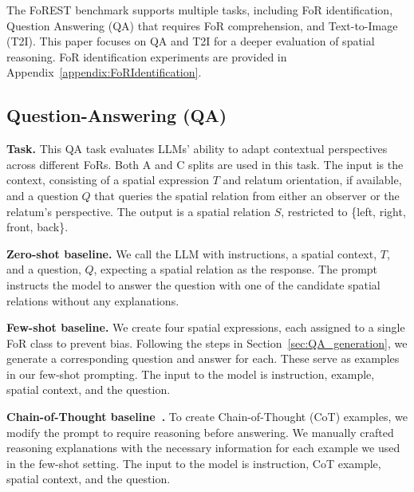 The FoREST benchmark supports multiple tasks, including FoR identification, Question Answering (QA) that requires FoR comprehension, and Text-to-Image (T2I). This paper focuses on QA and T2I for a deeper evaluation of spatial reasoning. 
FoR identification experiments are provided in Appendix~\ref{appendix:FoRIdentification}.

\subsection{Question-Answering (QA)}\label{sec:QA_explanation}

\noindent\textbf{Task.}
This QA task evaluates LLMs’ ability to adapt contextual perspectives across different FoRs.
Both A and C splits are used in this task. 
The input is the context, consisting of a spatial expression $T$ and relatum orientation, if available, and a question $Q$ that queries the spatial relation from either an observer or the relatum’s perspective. 
The output is a spatial relation $S$, restricted to \{left, right, front, back\}.




\noindent\textbf{Zero-shot baseline.} 
We call the LLM with instructions, a spatial context, $T$, and a question, $Q$, expecting a spatial relation as the response. 
The prompt instructs the model to answer the question with one of the candidate spatial relations without any explanations.


\noindent\textbf{Few-shot baseline.} 
We create four spatial expressions, each assigned to a single FoR class to prevent bias. Following the steps in Section~\ref{sec:QA_generation}, we generate a corresponding question and answer for each. These serve as examples in our few-shot prompting. The input to the model is instruction, example, spatial context, and the question.

\noindent\textbf{Chain-of-Thought baseline~\citep{wei2023chainofthoughtpromptingelicitsreasoning}.}
To create Chain-of-Thought (CoT) examples, we modify the prompt to require reasoning before answering.
We manually crafted reasoning explanations with the necessary information for each example we used in the few-shot setting.
The input to the model is instruction, CoT example, spatial context, and the question.



